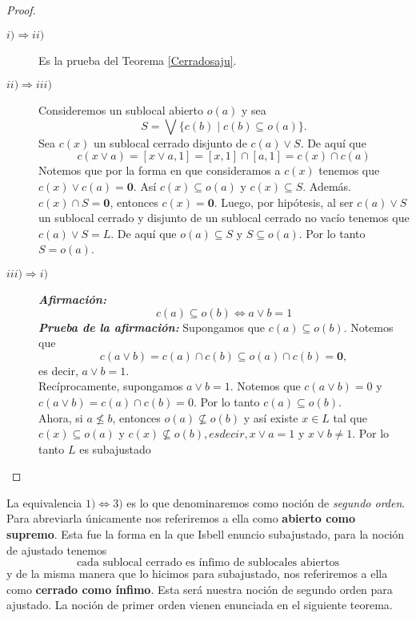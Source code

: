 \documentclass{comunicaciones}
\begin{document}
\begin{proof}
    \begin{description}
        \item[$i)\Rightarrow ii)$] Es la prueba del Teorema \ref{Cerradosaju}.
        \item[$ii)\Rightarrow iii)$] Consideremos un sublocal abierto $o(a)$ y sea 
        \[
        S=\bigvee\{c(b)\mid c(b)\subseteq o(a)\}.
        \]
        Sea $c(x)$ un sublocal cerrado disjunto de $c(a)\vee S$. De aquí que 
        \[
        c(x\vee a)=[x\vee a, 1]=[x, 1]\cap [a, 1]=c(x)\cap c(a)
        \]
        Notemos que por la forma en que consideramos a $c(x)$ tenemos que $c(x)\vee c(a)=\mathbf{0}$. Así $c(x)\subseteq o(a)$ y $c(x)\subseteq S$. Además. $c(x)\cap S=\mathbf{0}$, entonces $c(x)=\mathbf{0}$. Luego, por hipótesis, al ser $c(a)\vee S$ un sublocal cerrado y disjunto de un sublocal cerrado no vacío tenemos que $c(a)\vee S=L$. De aquí que $o(a)\subseteq S$ y $S\subseteq o(a)$. Por lo tanto $S=o(a)$.
        \item[$iii)\Rightarrow i)$] \emph{\textbf{Afirmación:}} 
        \begin{equation}\label{c(a)yo(b)}
            c(a)\subseteq o(b)\Leftrightarrow a\vee b=1
        \end{equation}
        \emph{\textbf{Prueba de la afirmación:}} Supongamos que $c(a)\subseteq o(b)$. Notemos que 
        \[
        c(a\vee b)=c(a)\cap c(b)\subseteq o(a)\cap c(b)=\mathbf{0},
        \]
        es decir, $a\vee b=1$.\\

        \noindent
        Recíprocamente, supongamos $a\vee b=1$. Notemos que $c(a\vee b)=0$ y $c(a\vee b)=c(a)\cap c(b)=0$. Por lo tanto $c(a)\subseteq o(b)$.\\

        Ahora, si $a\nleq b$, entonces $o(a)\nsubseteq o(b)$ y así existe $x\in L$ tal que $c(x)\subseteq o(a)$ y $c(x)\nsubseteq o(b), es decir, x\vee a=1$ y $x\vee b\neq 1$. Por lo tanto $L$ es subajustado
    \end{description}
\end{proof}

La equivalencia $1)\Leftrightarrow 3)$ es lo que denominaremos como noción de \emph{segundo orden}. Para abreviarla únicamente nos referiremos a ella como \textbf{abierto como supremo}. Esta fue la forma en la que Isbell enuncio subajustado, para la noción de ajustado tenemos 
\[
\mbox{cada sublocal cerrado es ínfimo de sublocales abiertos}
\]
y de la misma manera que lo hicimos para subajustado, nos referiremos a ella como \textbf{cerrado como ínfimo}. Esta será nuestra noción de segundo orden para ajustado. La noción de primer orden vienen enunciada en el siguiente teorema.
\end{document}
